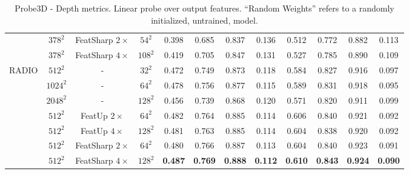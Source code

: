 \begin{table*}[!h]
{\begin{tabular}{c|ccc|cccc|cccc}
        \cline{2-12}
         & $378^2$ & FeatSharp $2\times$ & $54^2$ & 0.398 & 0.685 & 0.837 & 0.136 & 0.512 & 0.772 & 0.882 & 0.113 \\
         & $378^2$ & FeatSharp $4\times$ & $108^2$ & 0.419 & 0.705 & 0.847 & 0.131 & 0.527 & 0.785 & 0.890 & 0.109 \\
        \hline
        \hline
        \multirow{7}{*}{RADIO} & $512^2$  & -         & $32^2$  & 0.472 & 0.749 & 0.873 & 0.118 & 0.584 & 0.827 & 0.916 & 0.097 \\
         & $1024^2$ & -         & $64^2$  & 0.478 & 0.756 & 0.877 & 0.115 & 0.589 & 0.831 & 0.918 & 0.095 \\
         & $2048^2$ & -         & $128^2$ & 0.456 & 0.739 & 0.868 & 0.120 & 0.571 & 0.820 & 0.911 & 0.099  \\
        \cline{2-12}
         & $512^2$  & FeatUp $2\times$ & $64^2$  & 0.482 & 0.764 & 0.885 & 0.114 & 0.606 & 0.840 & 0.921 & 0.092 \\
         & $512^2$  & FeatUp $4\times$ & $128^2$ & 0.481 & 0.763 & 0.885 & 0.114 & 0.604 & 0.838 & 0.920 & 0.092 \\
        \cline{2-12}
         & $512^2$  & FeatSharp $2\times$ & $64^2$  & 0.480 & 0.766 & 0.887 & 0.113 & 0.604 & 0.840 & 0.923 & 0.091 \\
         & $512^2$  & FeatSharp $4\times$ & $128^2$ & \textbf{0.487} & \textbf{0.769} & \textbf{0.888} & \textbf{0.112} & \textbf{0.610} & \textbf{0.843} & \textbf{0.924} & \textbf{0.090} 
    \end{tabular}
    }
    \caption{Probe3D - Depth metrics. Linear probe over output features. ``Random Weights'' refers to a randomly initialized, untrained, model.}
    \label{tab:probe3d-depth-metrics}
\end{table*}

